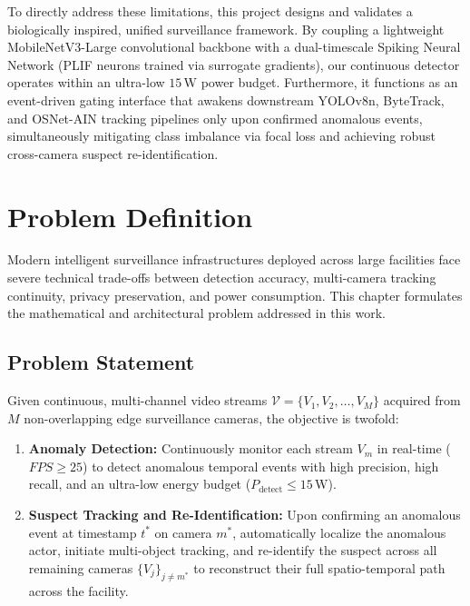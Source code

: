 \documentclass[12pt,a4paper]{report}
\begin{document}
To directly address these limitations, this project designs and validates a biologically inspired, unified surveillance framework. By coupling a lightweight MobileNetV3-Large convolutional backbone with a dual-timescale Spiking Neural Network (PLIF neurons trained via surrogate gradients), our continuous detector operates within an ultra-low $15\,\text{W}$ power budget. Furthermore, it functions as an event-driven gating interface that awakens downstream YOLOv8n, ByteTrack, and OSNet-AIN tracking pipelines only upon confirmed anomalous events, simultaneously mitigating class imbalance via focal loss and achieving robust cross-camera suspect re-identification.


\chapter{Problem Definition}

Modern intelligent surveillance infrastructures deployed across large facilities face severe technical trade-offs between detection accuracy, multi-camera tracking continuity, privacy preservation, and power consumption. This chapter formulates the mathematical and architectural problem addressed in this work.

\section{Problem Statement}
Given continuous, multi-channel video streams $\mathcal{V} = \{V_1, V_2, \dots, V_M\}$ acquired from $M$ non-overlapping edge surveillance cameras, the objective is twofold:
\begin{enumerate}
    \item \textbf{Anomaly Detection:} Continuously monitor each stream $V_m$ in real-time ($FPS \ge 25$) to detect anomalous temporal events with high precision, high recall, and an ultra-low energy budget ($P_{\text{detect}} \le 15\,\text{W}$).
    \item \textbf{Suspect Tracking and Re-Identification:} Upon confirming an anomalous event at timestamp $t^*$ on camera $m^*$, automatically localize the anomalous actor, initiate multi-object tracking, and re-identify the suspect across all remaining cameras $\{V_j\}_{j \ne m^*}$ to reconstruct their full spatio-temporal path across the facility.
\end{enumerate}
\end{document}
